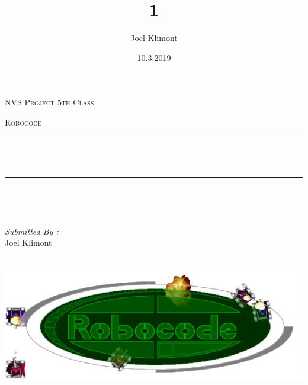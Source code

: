 \documentclass[12pt]{report}
\title{1}
\author{Joel Klimont}
\date{10.3.2019}
\makeatletter
\let\thetitle\@title
\makeatother
\begin{document}

\begin{titlepage}
	\centering
    \vspace*{0.5 cm}
\begin{center}    \textsc{\Large   NVS Project 5th Class}\\[2.0 cm]	\end{center}%
	\textsc{\Large Robocode}\\[0.5 cm]				%
	\rule{\linewidth}{0.2 mm} \\[0.4 cm]
	{ \huge \bfseries \thetitle}\\
	\rule{\linewidth}{0.2 mm} \\[1.5 cm]
	
	\begin{minipage}{0.4\textwidth}
		\begin{flushleft} \large
			\end{flushleft}
			\end{minipage}~
			\begin{minipage}{0.4\textwidth}
            
			\begin{flushright} \large
			\emph{Submitted By :} \\
			Joel Klimont
		\end{flushright}
           
	\end{minipage}\\[2 cm]
	
	\includegraphics[scale = 0.5]{robocode_logo.jpg}
    
    
    
    
	
\end{titlepage}
\end{document}
